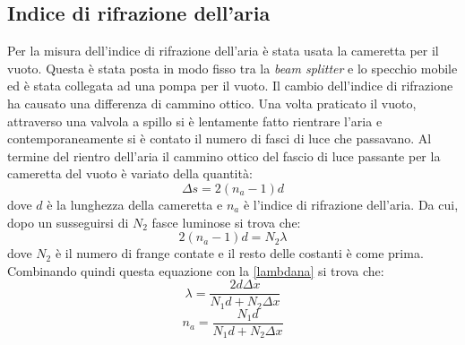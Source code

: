 \documentclass[a4paper,11pt]{article}
\begin{document}
	\subsection{Indice di rifrazione dell'aria}
	Per la misura dell'indice di rifrazione dell'aria è stata usata la cameretta per il vuoto. Questa è stata posta in modo fisso tra la \emph{beam splitter} e lo specchio mobile ed è stata collegata ad una pompa per il vuoto. Il cambio dell'indice di rifrazione ha causato una differenza di cammino ottico. Una volta praticato il vuoto, attraverso una valvola a spillo si è lentamente fatto rientrare l'aria e contemporaneamente si è contato il numero di fasci di luce che passavano. Al termine del rientro dell'aria il cammino ottico del fascio di luce passante per la cameretta del vuoto è variato della quantità:
	\begin{equation}\label{deltavuoto}
		\Delta s = 2(n_a-1)d
	\end{equation}
	dove $ d $ è la lunghezza della cameretta e $ n_a $ è l'indice di rifrazione dell'aria. Da cui, dopo un susseguirsi di $ N_2 $ fasce luminose si trova che:
	\begin{equation}\label{deltatotaria}
		2(n_a-1)d=N_2\lambda
	\end{equation}
	dove $ N_2 $ è il numero di frange contate e il resto delle costanti è come prima. Combinando quindi questa equazione con la \ref{lambdana} si trova che:
	\begin{equation}\label{lambda}
		\lambda=\dfrac{2d\Delta x}{N_1 d + N_2 \Delta x}
	\end{equation}
	\begin{equation}\label{na}
		n_a=\dfrac{N_1 d}{N_1 d + N_2 \Delta x}
	\end{equation}
\end{document}
